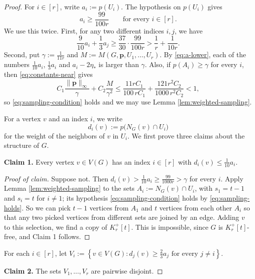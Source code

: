 \documentclass[11pt, a4paper]{article}
\theoremstyle{definition}
\theoremstyle{plain}
\renewcommand{\le}{\leqslant}
\renewcommand{\ge}{\geqslant}
\newcommand{\pmax}{\lVert \bm{p} \rVert_{\infty}}
\begin{document}
\begin{proof}
For $i\in[r]$, write $a_i:=p(U_i)$. 
The hypothesis on $p(U_i)$ gives 
\begin{equation}\label{eq:a-lower}
  a_i\ge \frac{99}{100r}
  \qquad\text{for every }i\in[r].
\end{equation}
We use this twice. First, for any two different
indices $i,j$, we have 
\begin{equation}\label{eq:two-part-deficit}
  \frac{9}{10}a_i+\frac13a_j
  \ge \frac{37}{30}\cdot\frac{99}{100r} 
  >\frac1r+\frac{1}{10r}.
\end{equation}
Second, put  $\gamma:=\frac{1}{11r}$ and 
$M:=M(G,\bm{p},U_1,\ldots,U_r)$.
By \eqref{eq:a-lower}, each of the numbers
$\frac{1}{10}a_i$, $\frac13a_i$ and
$a_i-2\eta_*$ is larger than $\gamma$. Also, if
$p(A_i)\ge \gamma$ for every $i$, then
\eqref{eq:constants-near} gives
\begin{equation}\label{eq:sampling-holds}
  C_1\frac{\pmax}{\gamma}
  +C_2\frac{M}{\gamma^2}
  \le \frac{11rC_1}{100\,rC_1}
     +\frac{121r^2C_2}{1000\,r^2C_2}
   <1,
\end{equation}
so \eqref{eq:sampling-condition} holds and we
may use Lemma \ref{lem:weighted-sampling}.

For a vertex $v$ and an index $i$, we write
\[
  d_i(v):=p\bigl(N_G(v)\cap U_i\bigr)
\]
for the weight of the neighbors of $v$ in
$U_i$. We first prove three claims about the
structure of $G$.

\medskip
\noindent\textbf{Claim 1.}
Every vertex $v\in V(G)$ has an index
$i\in[r]$ with $d_i(v)\le \frac{1}{10}a_i$.

\begin{proof}[Proof of claim]
Suppose not. Then
$d_i(v)>\frac{1}{10}a_i\ge \frac{99}{1000r}
>\gamma$ for every $i$. Apply Lemma
\ref{lem:weighted-sampling} to the sets
$A_i:=N_G(v)\cap U_i$, with $s_1=t-1$ and
$s_i=t$ for $i\ne 1$; its hypothesis
\eqref{eq:sampling-condition} holds by
\eqref{eq:sampling-holds}. So we can pick $t-1$
vertices from $A_1$ and $t$ vertices from each
other $A_i$ so that any two picked vertices from
different sets are joined by an edge. Adding $v$ to
this selection, we find a copy of $K_r^+[t]$. This is impossible, since $G$ is
$K_r^+[t]$-free, and Claim 1 follows.
\end{proof}


For each $i\in[r]$, let
$ V_i:=\left\{v\in V(G):d_j(v)\ge \tfrac23 a_j
    \text{ for every }j\ne i\right\}$. 

\medskip
\noindent\textbf{Claim 2.}
The sets $V_1,\ldots,V_r$ are pairwise disjoint.


\end{proof}
\end{document}
